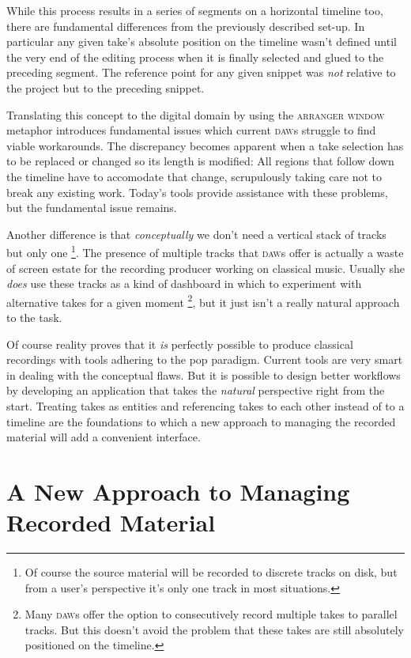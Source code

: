 \documentclass[11pt,a4paper]{article}
\newcommand*{\term}[1]{\textsc{#1}}
\begin{document}
While this process results in a series of segments on a horizontal timeline too,
there are fundamental differences from the previously described set-up.
In particular any given take's absolute position on the timeline wasn't defined until the
very end of the editing process when it is finally selected and glued to the
preceding segment.
The reference point for any given snippet was \emph{not} relative to the project
but to the preceding snippet.

Translating this concept to the digital domain by using the \term{arranger window}
metaphor introduces fundamental issues which current \textsc{daw}s struggle to find
viable workarounds.
The discrepancy becomes apparent when a take selection has to be replaced or changed
so its length is modified: All regions that follow down the timeline have
to accomodate that change, scrupulously taking care not to break any existing work.
Today's tools provide assistance with these problems, but the fundamental
issue remains.

Another difference is that \emph{conceptually} we don't need a vertical stack of
tracks but only one%
\footnote{Of course the source material will be recorded to discrete tracks on
disk, but from a user's perspective it's only one track in most situations.}.
The presence of multiple tracks that \textsc{daw}s offer is actually a waste of
screen estate for the recording producer working on classical music.
Usually she \emph{does} use these tracks as a kind of dashboard in which to
experiment with alternative takes for a given moment%
\footnote{Many \textsc{daw}s offer the option to consecutively record multiple
takes to parallel tracks. But this doesn't avoid the problem that these takes
are still absolutely positioned on the timeline.}, but it just isn't a really
natural approach to the task.

Of course reality proves that it \emph{is} perfectly possible to produce classical
recordings with tools adhering to the pop paradigm. Current tools are very
smart in dealing with the conceptual flaws.
But it is possible to design better workflows by developing an application that
takes the \emph{natural} perspective right from the start.
Treating takes as entities and referencing takes to each other instead of to a
timeline are the foundations to which a new approach to managing the recorded
material will add a convenient interface.


\section{A New Approach to Managing Recorded Material}
\end{document}
